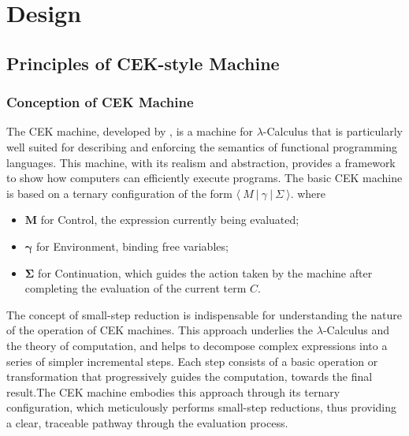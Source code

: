 \documentclass{l4proj}
\begin{document}
\chapter{Design}

\section{Principles of CEK-style Machine}
\subsection{Conception of CEK Machine}

The CEK machine, developed by \cite{felleisen_1986_control}, is a machine for $\lambda$-Calculus that is particularly well suited for describing and enforcing the semantics of functional programming languages. This machine, with its realism and abstraction, provides a framework to show how computers can efficiently execute programs. The basic CEK machine is based on a ternary configuration of the form $ \langle \ M\:|\:\gamma\:|\:\Sigma \ \rangle $. where
\begin{itemize}
    \item $\textbf{M}$ for Control, the expression currently being evaluated;
    \item $\boldsymbol{\gamma}$ for Environment, binding free variables;
    \item $\boldsymbol{\Sigma}$ for Continuation, which guides the action taken by the machine after completing the evaluation of the current term $C$.
\end{itemize}
The concept of small-step reduction is indispensable for understanding the nature of the operation of CEK machines. This approach underlies the $\lambda$-Calculus and the theory of computation, and helps to decompose complex expressions into a series of simpler incremental steps. Each step consists of a basic operation or transformation that progressively guides the computation, towards the final result.The CEK machine embodies this approach through its ternary configuration, which meticulously performs small-step reductions, thus providing a clear, traceable pathway through the evaluation process.
\end{document}
